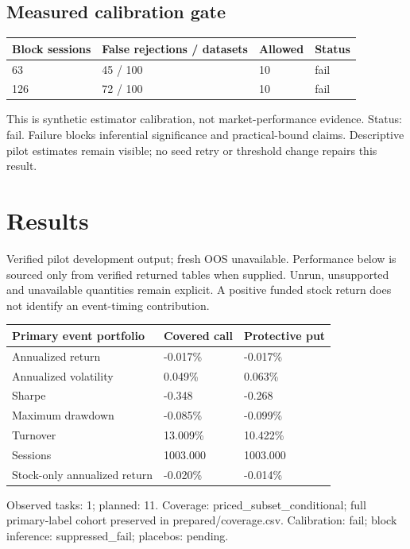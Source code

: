 \documentclass[11pt,letterpaper]{article}
\begin{document}
\subsection*{Measured calibration gate}
\begin{tabular}{@{}p{}p{}p{}p{}@{}}
\toprule
\textbf{Block sessions} & \textbf{False rejections / datasets} & \textbf{Allowed} & \textbf{Status} \\
\midrule
63 & 45 / 100 & 10 & fail \\
126 & 72 / 100 & 10 & fail \\
\bottomrule
\end{tabular}
\par\smallskip
This is synthetic estimator calibration, not market-performance evidence. Status: fail. Failure blocks inferential significance and practical-bound claims. Descriptive pilot estimates remain visible; no seed retry or threshold change repairs this result.


\clearpage
\section{Results}
Verified pilot development output; fresh OOS unavailable. Performance below is sourced only from verified returned tables when supplied. Unrun, unsupported and unavailable quantities remain explicit. A positive funded stock return does not identify an event-timing contribution.

\begin{tabular}{@{}p{}p{}p{}@{}}
\toprule
\textbf{Primary event portfolio} & \textbf{Covered call} & \textbf{Protective put} \\
\midrule
Annualized return & -0.017\% & -0.017\% \\
Annualized volatility & 0.049\% & 0.063\% \\
Sharpe & -0.348 & -0.268 \\
Maximum drawdown & -0.085\% & -0.099\% \\
Turnover & 13.009\% & 10.422\% \\
Sessions & 1003.000 & 1003.000 \\
Stock-only annualized return & -0.020\% & -0.014\% \\
\bottomrule
\end{tabular}
\par\smallskip
Observed tasks: 1; planned: 11. Coverage: priced\_subset\_conditional; full primary-label cohort preserved in prepared/coverage.csv. Calibration: fail; block inference: suppressed\_fail; placebos: pending.
\end{document}
